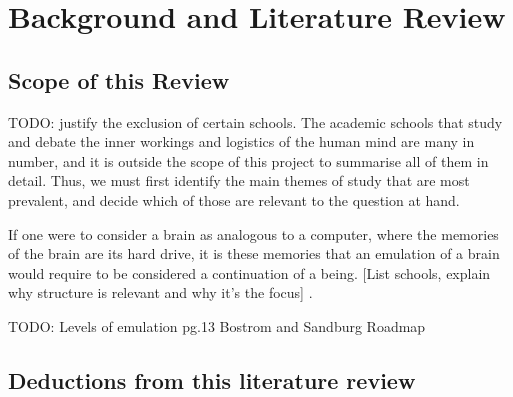 \chapter{Background and Literature Review}

\section{Scope of this Review}
TODO: justify the exclusion of certain schools. 
The academic schools that study and debate the inner workings and logistics of
the human mind are many in number, and it is outside the scope of this project
to summarise all of them in detail. Thus, we must first identify the main themes
of study that are most prevalent, and decide which of those are relevant to
the question at hand. 

If one were to consider a brain as analogous to a computer, where the memories
of the brain are its hard drive, it is these memories that an emulation of a
brain would require to be considered a continuation of a being. [List schools,
explain why structure is relevant and why it's the focus]
\autocite{eichenbaum_cognitive_2011}.

TODO: Levels of emulation pg.13 Bostrom and Sandburg Roadmap






\section{Deductions from this literature review}

